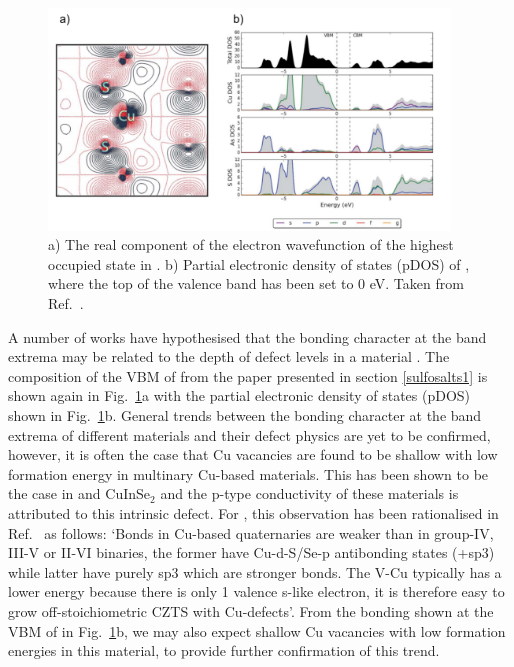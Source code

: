 \documentclass[11pt, twoside]{report}
\begin{document}
\begin{figure}[h!]
    \centering
    \includegraphics[width=0.95\textwidth]{figures/enargite_bonding.png}
    \caption[a) The real component of the electron wavefunction of the highest occupied state in {\enargite}. b) Partial electronic density of states (pDOS) of {\enargite}, where the top of the valence band has been set to 0 eV.]{a) The real component of the electron wavefunction of the highest occupied state in {\enargite}. b) Partial electronic density of states (pDOS) of {\enargite}, where the top of the valence band has been set to 0 eV. Taken from Ref.~.}
    \label{enargite_bonding}
\end{figure}

A number of works have hypothesised that the bonding character at the band extrema may be related to the depth of defect levels in a material \cite{MAPI_defect_phys, Andriy_defect_tolerance, Zhang_CIS, MIT_defect_tolerance}. The composition of the VBM of {\enargite} from the paper presented in section \ref{sulfosalts1} is shown again in Fig.~\ref{enargite_bonding}a with the partial electronic density of states (pDOS) shown in Fig.~\ref{enargite_bonding}b. General trends between the bonding character at the band extrema of different materials and their defect physics are yet to be confirmed, however, it is often the case that Cu vacancies are found to be shallow with low formation energy in multinary Cu-based materials. This has been shown to be the case in {\CZTS} \cite{defects_Chen_large} and CuInSe$_2$ \cite{Zhang_CIS} and the p-type conductivity of these materials is attributed to this intrinsic defect. For {\CZTS}, this observation has been rationalised in Ref.~ as follows: `Bonds in Cu-based quaternaries are weaker than in group-IV, III-V or II-VI binaries, the former have Cu-d-S/Se-p antibonding states (+sp3) while latter have purely sp3 which are stronger bonds. The V-Cu typically has a lower energy because there is only 1 valence s-like electron, it is therefore easy to grow off-stoichiometric CZTS with Cu-defects'. From the bonding shown at the VBM of {\enargite} in Fig.~\ref{enargite_bonding}b, we may also expect shallow Cu vacancies with low formation energies in this material, to provide further confirmation of this trend.
\end{document}
